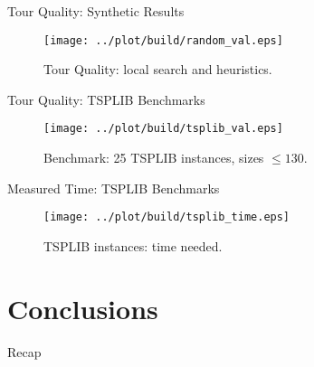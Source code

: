\documentclass[
  size=8pt,
  style=klope,
  paper=screen,
  mode=present,
  nohandoutpagebreaks,
  pauseslide,
  hlsections,
  fleqn,
]{powerdot}
\begin{document}
\begin{slide}[toc=Benchmarks: Solutions]{Tour Quality: Synthetic Results}
  \begin{figure}[H]
    \centering
    \texttt{[image: ../plot/build/random\_val.eps]}
    \caption{Tour Quality: local search and heuristics.}
  \end{figure}
\end{slide}

\begin{slide}[toc=]{Tour Quality: TSPLIB Benchmarks}
  \begin{figure}[H]
    \centering
    \texttt{[image: ../plot/build/tsplib\_val.eps]}
    \caption{Benchmark: 25 TSPLIB instances, sizes $\leq 130$.}
  \end{figure}
\end{slide}

\begin{slide}[toc=]{Measured Time: TSPLIB Benchmarks}
  \begin{figure}[H]
    \centering
    \texttt{[image: ../plot/build/tsplib\_time.eps]}
    \caption{TSPLIB instances: time needed.}
  \end{figure}
\end{slide}

\section[template=wideslide]{Conclusions}

\begin{slide}[toc=Recap]{Recap}
\tableofcontents[content=all,type=0]
\end{slide}
\end{document}
